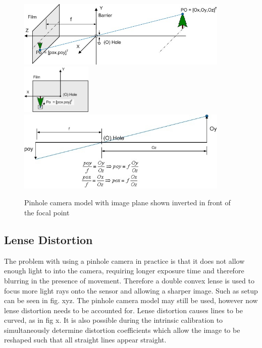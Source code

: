 \begin{figure}[h!]
  \centering
    \includegraphics[width=0.9\textwidth]{chapters/images/cam_model_fig41} \\
    \includegraphics[width=0.3\textwidth]{chapters/images/cam_model_fig42} \\
    \includegraphics[width=0.9\textwidth]{chapters/images/cam_model_fig43} 
  \caption{Pinhole camera model with image plane shown inverted in front of the focal point}
\end{figure}


\subsection{Lense Distortion}


The problem with using a pinhole camera in practice is that it does not allow enough light to into
the camera, requiring longer exposure time and therefore blurring in the presence of movement. 
Therefore a double convex lense is used to focus more light rays onto the sensor and allowing a
sharper image.  Such as setup can be seen in fig. xyz.  The pinhole camera model may still be used,
however now lense distortion needs to be accounted for.  Lense distortion causes lines to be
curved, as in fig x.  It is also possible during the intrinsic calibration to simultaneously
determine distortion coefficients which allow the image to be reshaped such that all straight lines
appear straight.

